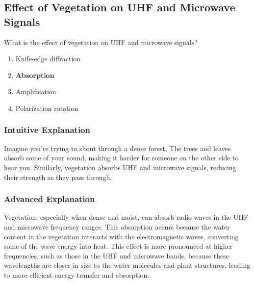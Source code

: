 \subsection{Effect of Vegetation on UHF and Microwave Signals}
\label{T3A02}

\begin{tcolorbox}[colback=gray!10!white,colframe=black!75!black,title=T3A02]
What is the effect of vegetation on UHF and microwave signals?
\begin{enumerate}[noitemsep]
    \item Knife-edge diffraction
    \item \textbf{Absorption}
    \item Amplification
    \item Polarization rotation
\end{enumerate}
\end{tcolorbox}

\subsubsection*{Intuitive Explanation}
Imagine you're trying to shout through a dense forest. The trees and leaves absorb some of your sound, making it harder for someone on the other side to hear you. Similarly, vegetation absorbs UHF and microwave signals, reducing their strength as they pass through.

\subsubsection*{Advanced Explanation}
Vegetation, especially when dense and moist, can absorb radio waves in the UHF and microwave frequency ranges. This absorption occurs because the water content in the vegetation interacts with the electromagnetic waves, converting some of the wave energy into heat. This effect is more pronounced at higher frequencies, such as those in the UHF and microwave bands, because these wavelengths are closer in size to the water molecules and plant structures, leading to more efficient energy transfer and absorption.